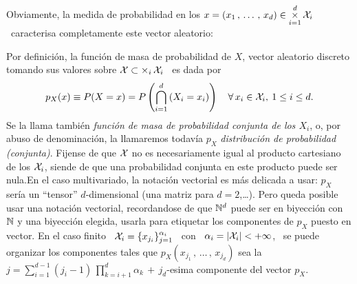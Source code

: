 Obviamente, la  medida de probabilidad  en los $\displaystyle  x = (x_1 \,  , \,
\ldots \, , \, x_d)  \in \operatorname*{\times}_{i=1}^d \mathcal{X}_i$ \ caracterisa completamente este
vector aleatorio:
%
\begin{definicion}
  Por  definici\'on,  la  funci\'on  de  masa de  probabilidad  de  $X$,  vector
  aleatorio discreto tomando sus valores sobre $\mathcal{X} \subset \operatorname*{\times}_i \mathcal{X}_i$ \ es
  dada por
  \[
  p_X(x) \equiv  P(X =  x) =  P\left( \bigcap_{i=1}^d \left(  X_i =  x_i \right)
  \right) \quad \forall \, x_i \in \mathcal{X}_i, \: 1 \le i \le d.
  \]
  Se la llama  tambi\'en {\it funci\'on de masa de  probabilidad conjunta de los
    $X_i$}, o, por  abuso de denominaci\'on, la llamaremos  todav\'ia $p_X$ {\it
    distribuci\'on  de probabilidad  (conjunta)}.   Fijense de  que  $\mathcal{X}$ no  es
  necesariamente igual al  producto cartesiano de los $\mathcal{X}_i$,  siende de que una
  probabilidad  conjunta en  este producto  puede ser  nula.\newline En  el caso
  multivariado, la notaci\'on vectorial es  m\'as delicada a usar: $p_X$ ser\'ia
  un ``tensor''  $d$-dimensional (una matriz  para $d = 2$,\ldots).   Pero queda
  posible usar una notaci\'on vectorial, recordandose de que $\mathbb{N}^d$ puede ser
  en biyecci\'on  con $\mathbb{N}$ y  una biyecci\'on elegida, usarla  para etiquetar
  los componentes  de $p_X$ puesto en  vector.  En el  caso finito \ $\mathcal{X}_i  = \{
  x_{j_i} \}_{j=1}^{\alpha_i}$ \ con \ $\alpha_i = |\mathcal{X}_i| < +\infty$, \ se puede
  organizar  los  componentes tales  que  $p_X(x_{j_1}\, ,  \,  \ldots  \, ,  \,
  x_{j_d})$  sea   la  $\displaystyle  j   =  \sum_{i=1}^{d-1}  (j_i  -   1)  \,
  \prod_{k=i+1}^d \alpha_k \, + \, j_d$-esima componente del vector $p_X$.
\end{definicion}
%
\noindent {}

